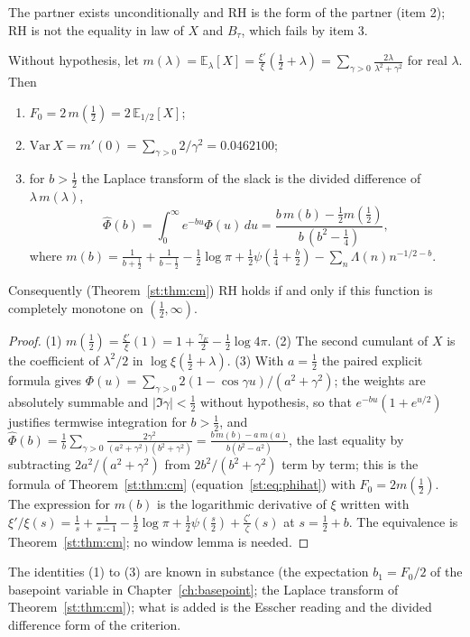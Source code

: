 The partner exists unconditionally and RH is the form of the partner (item 2); RH is not the equality in law of $X$ and $B_\tau$, which fails by item 3.

\begin{theorem}\label{mqt:thm:esscher}
Without hypothesis, let $m(\lambda)=\mathbb E_\lambda[X]=\frac{\xi'}\xi(\frac12+\lambda)=\sum_{\gamma>0}\frac{2\lambda}{\lambda^2+\gamma^2}$ for real $\lambda$. Then
\begin{enumerate}
\item $F_0=2\,m(\tfrac12)=2\,\mathbb E_{1/2}[X]$;
\item $\mathrm{Var}\,X=m'(0)=\sum_{\gamma>0}2/\gamma^2=0.0462100$;
\item for $b>\frac12$ the Laplace transform of the slack is the divided difference of $\lambda\,m(\lambda)$,
\[
\hat\Phi(b)=\int_0^\infty e^{-bu}\Phi(u)\,du=\frac{b\,m(b)-\frac12m(\frac12)}{b\,(b^2-\frac14)},
\]
where $m(b)=\frac1{b+\frac12}+\frac1{b-\frac12}-\frac12\log\pi+\frac12\psi(\frac14+\frac b2)-\sum_n\Lambda(n)n^{-1/2-b}$.
\end{enumerate}
Consequently (Theorem~\ref{st:thm:cm}) RH holds if and only if this function is completely monotone on $(\frac12,\infty)$.
\end{theorem}

\begin{proof}
(1) $m(\frac12)=\frac{\xi'}\xi(1)=1+\frac{\gamma_E}2-\frac12\log4\pi$. (2) The second cumulant of $X$ is the coefficient of $\lambda^2/2$ in $\log\xi(\frac12+\lambda)$. (3) With $a=\frac12$ the paired explicit formula gives $\Phi(u)=\sum_{\gamma>0}2(1-\cos\gamma u)/(a^2+\gamma^2)$; the weights are absolutely summable and $|\Im\gamma|<\frac12$ without hypothesis, so that $e^{-bu}(1+e^{u/2})$ justifies termwise integration for $b>\frac12$, and $\hat\Phi(b)=\frac1b\sum_{\gamma>0}\frac{2\gamma^2}{(a^2+\gamma^2)(b^2+\gamma^2)}=\frac{b\,m(b)-a\,m(a)}{b(b^2-a^2)}$, the last equality by subtracting $2a^2/(a^2+\gamma^2)$ from $2b^2/(b^2+\gamma^2)$ term by term; this is the formula of Theorem~\ref{st:thm:cm} (equation~\eqref{st:eq:phihat}) with $F_0=2m(\frac12)$. The expression for $m(b)$ is the logarithmic derivative of $\xi$ written with $\xi'/\xi(s)=\frac1s+\frac1{s-1}-\frac12\log\pi+\frac12\psi(\frac s2)+\frac{\zeta'}\zeta(s)$ at $s=\frac12+b$. The equivalence is Theorem~\ref{st:thm:cm}; no window lemma is needed.
\end{proof}

The identities (1) to (3) are known in substance (the expectation $b_1=F_0/2$ of the basepoint variable in Chapter~\ref{ch:basepoint}; the Laplace transform of Theorem~\ref{st:thm:cm}); what is added is the Esscher reading and the divided difference form of the criterion.

